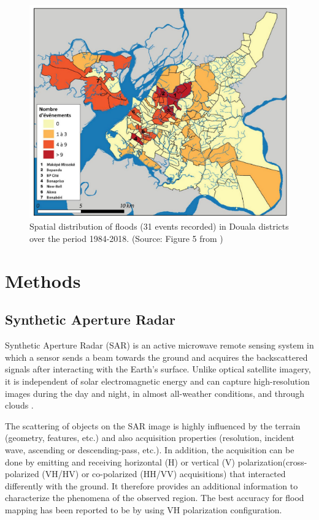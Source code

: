 \begin{figure}[hbt!]
	\centering
	\includegraphics[width=0.8\linewidth]{figure/flood_distribution1984_2018.png}
	\caption{Spatial distribution of floods (31 events recorded) in Douala districts over the period 1984-2018. (Source: Figure 5 from \cite{bruckmann2019analyse})}
	\label{fig:flood_distribution1984_2018}
\end{figure}


\section{Methods}

\subsection{Synthetic Aperture Radar}
Synthetic Aperture Radar (SAR) is an active microwave remote sensing system in which a sensor sends a beam towards the ground and acquires the backscattered signals after interacting with the Earth's surface. Unlike optical satellite imagery, it is independent of solar electromagnetic energy and can capture high-resolution images during the day and night, in almost all-weather conditions, and through clouds \cite{Landuyt2019,WANG1995324}.

The scattering of objects on the SAR image is highly influenced by the terrain (geometry, features, etc.) and also acquisition properties (resolution, incident wave, ascending or descending-pass, etc.). In addition, the acquisition can be done by emitting and receiving horizontal (H) or vertical (V) polarization(cross-polarized (VH/HV) or co-polarized (HH/VV) acquisitions) that interacted differently with the ground. It therefore provides an additional information to characterize the phenomena of the observed region\cite{WANG1995324}. The best accuracy for flood mapping has been reported to be by using VH polarization configuration\cite{carreno2019flood}.

